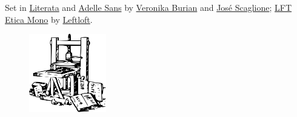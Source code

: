 \raggedright{Set in \href{https://www.type-together.com/literata-font/}{Literata} and \href{https://www.type-together.com/adelle-sans-font/}{Adelle Sans} by \href{https://www.type-together.com/veronika-burian/}{Veronika Burian} and \href{https://www.type-together.com/jose-scaglione/}{José Scaglione}; \href{https://www.type-together.com/lft-etica-mono-font/}{LFT Etica Mono} by \href{https://www.type-together.com/leftloft/}{Leftloft}.}

\begin{figure}[h!]
\centering
\includegraphics[width=0.3\textwidth]{../img/gutenberg_press.png}
\end{figure}